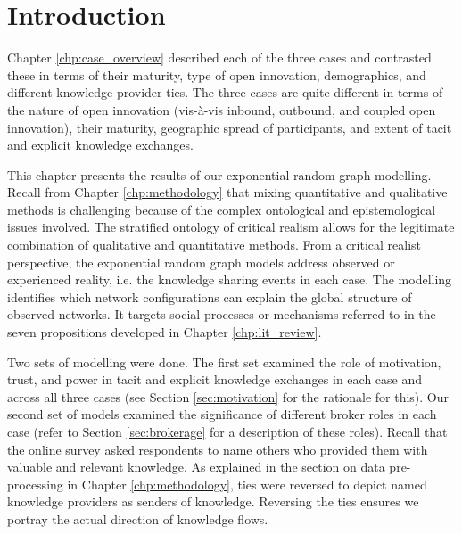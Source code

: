 \section{Introduction}

Chapter \ref{chp:case_overview} described each of the three cases and contrasted these in terms of their maturity, type of open innovation, demographics, and different knowledge provider ties. The three cases are quite different in terms of the nature of open innovation (vis-\`a-vis inbound, outbound, and coupled open innovation), their maturity, geographic spread of participants, and extent of tacit and explicit knowledge exchanges. \medskip

This chapter presents the results of our exponential random graph modelling. Recall from Chapter \ref{chp:methodology} that mixing quantitative and qualitative methods is challenging because of the complex ontological and epistemological issues involved. The stratified ontology of critical realism allows for the legitimate combination of qualitative and quantitative methods. From a critical realist perspective, the exponential random graph models address observed or experienced reality, i.e. the knowledge sharing events in each case. The modelling identifies which network configurations can explain the global structure of observed networks. It targets social processes or mechanisms referred to in the seven propositions developed in Chapter \ref{chp:lit_review}. \medskip

Two sets of modelling were done. The first set examined the role of motivation, trust, and power in tacit and explicit knowledge exchanges in each case and across all three cases (see Section \ref{sec:motivation} for the rationale for this). Our second set of models examined the significance of different broker roles in each case (refer to Section \ref{sec:brokerage} for a description of these roles). Recall that the online survey asked respondents to name others who provided them with valuable and relevant knowledge. As explained in the section on data pre-processing in Chapter \ref{chp:methodology}, ties were reversed to depict named knowledge providers as senders of knowledge. Reversing the ties ensures we portray the actual direction of knowledge flows. \medskip


